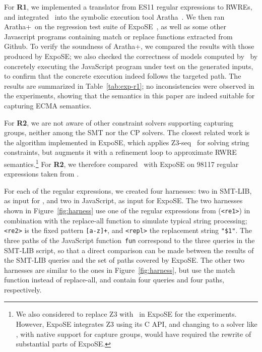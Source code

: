 \medskip
For \textbf{R1}, we implemented a translator from ES11 regular
expressions to RWREs, and integrated \ostrich\ into the symbolic
execution tool Aratha~\cite{aratha}. We then ran Aratha+\ostrich\ on
the regression test suite of ExpoSE~\cite{DBLP:conf/spin/LoringMK17},
as well as some other Javascript programs containing match or replace
functions extracted from Github. To verify the soundness of
Aratha+\ostrich, we compared the results with those produced by
ExpoSE; we also checked the correctness of models computed by
\ostrich\ by concretely executing the JavaScript program under test on
the generated inputs, to confirm that the concrete execution indeed
follows the targeted path. The results are summarized in Table~\ref{tab:exp-r1};
no inconsistencies were observed in the experiments, showing that the
semantics in this paper are indeed suitable for capturing ECMA
semantics.

For \textbf{R2}, we are not aware of other constraint solvers
supporting capturing groups, neither among the SMT nor  the
CP solvers. %
The closest related work is the algorithm implemented in ExpoSE, which
applies Z3-seq~\cite{Z3} for solving string constraints, but augments
it with a refinement loop to approximate RWRE
semantics.\footnote{We also considered to replace Z3 with \ostrich\ in
  ExpoSE for the experiments. However, ExpoSE integrates Z3 using its
  C API, and changing to a solver like \ostrich, with native support
  for capture groups, would have required the rewrite of substantial
  parts of ExpoSE.}
%
For \textbf{R2}, we therefore compared \ostrich\ with ExpoSE on 98117
regular expressions taken from \cite{DMC+19}.

For each of the regular expressions, we created four harnesses: two in
SMT-LIB, as input for \ostrich, and two in JavaScript, as input for
ExpoSE. The two harnesses shown in Figure~\ref{fig:harness} use one of the
regular expressions from \cite{DMC+19} (\verb!<re1>!) in combination with
the replace-all function to simulate typical string processing;
\verb!<re2>! is the fixed pattern \verb![a-z]+!, and \verb!<repl>! the
replacement string \verb!"$1"!. The three paths of the JavaScript
function~\verb!fun! correspond to the three queries in the SMT-LIB
script, so that a direct comparison can be made between the results of
the SMT-LIB queries and the set of paths covered by ExpoSE. The other
two harnesses are similar to the ones in Figure~\ref{fig:harness}, but
use the match function instead of replace-all, and contain four
queries and four paths, respectively.

